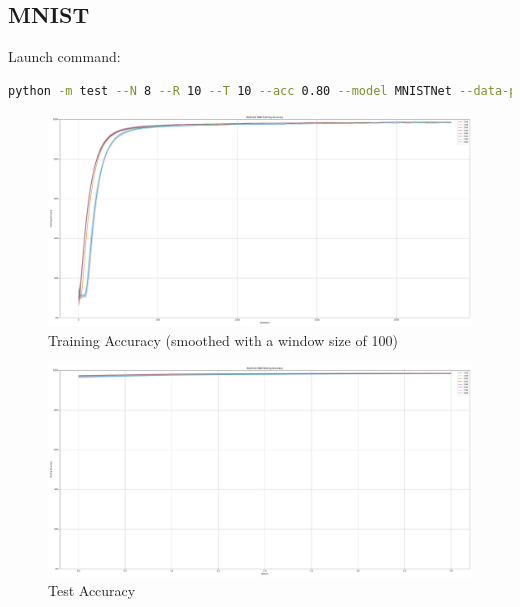     \subsection{MNIST}
    \label{appendix:accuracy_curves_mnist}
        Launch command: 
        \begin{lstlisting}[language=Bash, basicstyle=\small, breaklines=true]
python -m test --N 8 --R 10 --T 10 --acc 0.80 --model MNISTNet --data-path /scratch/zyi/codeSpace/data --dataset MNIST --batch-size 128 --opt adam --lr 2e-3 --lr-scheduler none --epochs 5 --lr-warmup-epochs 0 --output-dir /scratch/zyi/codeSpace/MultibitSpikes --mixup-alpha 0.0 --cutmix-alpha 0.0 --label-smoothing 0.0 --disable-amp
        \end{lstlisting}

        \begin{figure}[H]
            \centering
            \includegraphics[width=\textwidth]{../standard/MNIST/plots/mnist_train_acc.pdf}
            \caption{Training Accuracy (smoothed with a window size of 100)}
        \end{figure}
        \begin{figure}[H]
            \centering
            \includegraphics[width=\textwidth]{../standard/MNIST/plots/mnist_test_acc.pdf}
            \caption{Test Accuracy}
        \end{figure}
